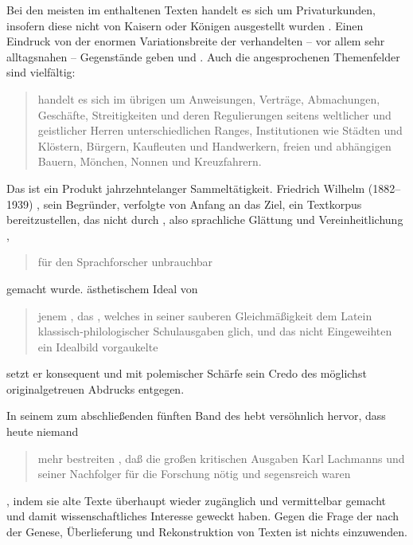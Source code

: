 %
Bei den meisten im \CAO{} enthaltenen Texten handelt es sich um Privaturkunden,
insofern diese nicht von Kaisern oder Königen ausgestellt wurden
\autocites[vgl.][575]{frenz1998a}[585]{frenz1998b}. Einen Eindruck von der
enormen Variationsbreite der verhandelten -- vor allem sehr alltagsnahen --
Gegen\-stände geben \citet[11]{schulze2011} und \citet[35--36]{ganslmayer2012}.
Auch die angesprochenen Themenfelder sind vielfältig:
\blockcquote[596]{schmidtwiegand1998b}{ handelt es sich im übrigen
um Anweisungen, Verträge, Abmachungen, Geschäfte, Streitigkeiten und deren
Regulierungen seitens weltlicher und geistlicher Herren unterschiedlichen
Ranges, Institutionen wie Städten und Klöstern, Bürgern, Kaufleuten und
Handwerkern, freien und abhängigen Bauern, Mönchen, Nonnen und Kreuzfahrern.}

Das \CAO{} ist ein Produkt jahrzehntelanger Sammeltätigkeit. Friedrich
Wilhelm\nocite{wilhelm1932} (1882--1939)%
, sein Begründer, verfolgte von Anfang an das Ziel, ein Textkorpus
bereitzustellen, das nicht durch , also sprachliche
Glättung und Vereinheitlichung \autocites[vgl.][76--84]{bein2011}{kragl2015},
\blockcquote[\RN{60}]{wilhelm1932}{für den Sprachforscher unbrauchbar} gemacht
wurde.  ästhetischem Ideal von
\blockcquote[\RN{3}]{wilhelm1932}{jenem , das
 \textelp{}, welches in seiner
sauberen Gleichmäßigkeit dem Latein klassisch-philo\-logi\-scher Schulausgaben
glich, und das \textelp{} nicht Eingeweihten ein Idealbild vorgaukelte} setzt
er konsequent und mit polemischer Schärfe sein Credo des möglichst
originalgetreuen Abdrucks entgegen.

In seinem  zum abschließenden fünften Band des
\CAO{} hebt \citeauthor{deboor1976} versöhnlich hervor, dass heute
niemand \blockcquote[\RN{13}]{deboor1976}{mehr bestreiten , daß
die großen kritischen Ausgaben Karl
Lachmanns und seiner Nachfolger für die Forschung nötig und
segensreich waren}, indem sie alte Texte überhaupt wieder zugänglich und
vermittelbar gemacht und damit wissenschaftliches Interesse geweckt haben.
Gegen die Frage der  nach der Genese, Überlieferung und
Rekonstruktion von Texten ist nichts einzuwenden.

